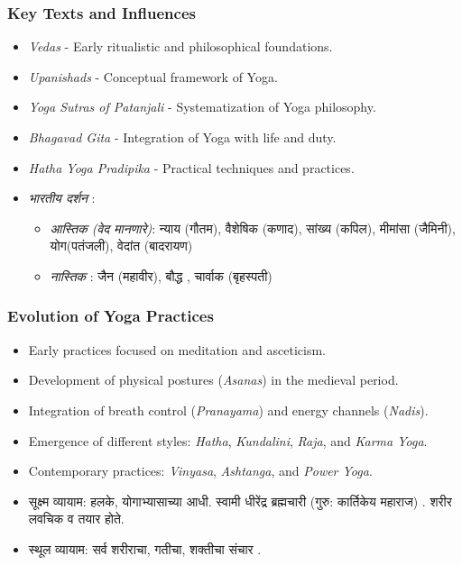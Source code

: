 \begin{frame}[fragile]\frametitle{Key Texts and Influences}

      \begin{itemize}
		\item \textit{Vedas} - Early ritualistic and philosophical foundations.
		\item \textit{Upanishads} - Conceptual framework of Yoga.
		\item \textit{Yoga Sutras of Patanjali} - Systematization of Yoga philosophy.
		\item \textit{Bhagavad Gita} - Integration of Yoga with life and duty.
		\item \textit{Hatha Yoga Pradipika} - Practical techniques and practices.
		\item \textit{भारतीय दर्शन} :
			\begin{itemize}
			\item \textit{आस्तिक (वेद मानणारे)}: न्याय (गौतम), वैशेषिक (कणाद), सांख्य (कपिल), मीमांसा (जैमिनी), योग(पतंजली), वेदांत (बादरायण)
			\item \textit{नास्तिक} : जैन (महावीर), बौद्ध , चार्वाक (बृहस्पती)
		    \end{itemize}
	  \end{itemize}

\end{frame}

\begin{frame}[fragile]\frametitle{Evolution of Yoga Practices}

      \begin{itemize}
		\item Early practices focused on meditation and asceticism.
		\item Development of physical postures (\textit{Asanas}) in the medieval period.
		\item Integration of breath control (\textit{Pranayama}) and energy channels (\textit{Nadis}).
		\item Emergence of different styles: \textit{Hatha}, \textit{Kundalini}, \textit{Raja}, and \textit{Karma Yoga}.
		\item Contemporary practices: \textit{Vinyasa}, \textit{Ashtanga}, and \textit{Power Yoga}.
		\item  सूक्ष्म व्यायाम: हलके, योगाभ्यासाच्या आधी. स्वामी धीरेंद्र ब्रह्मचारी (गुरु: कार्तिकेय महाराज) . शरीर लवचिक व तयार होते. 
		\item स्थूल व्यायाम: सर्व शरीराचा, गतीचा, शक्तीचा संचार . 

	  \end{itemize}

\end{frame}



